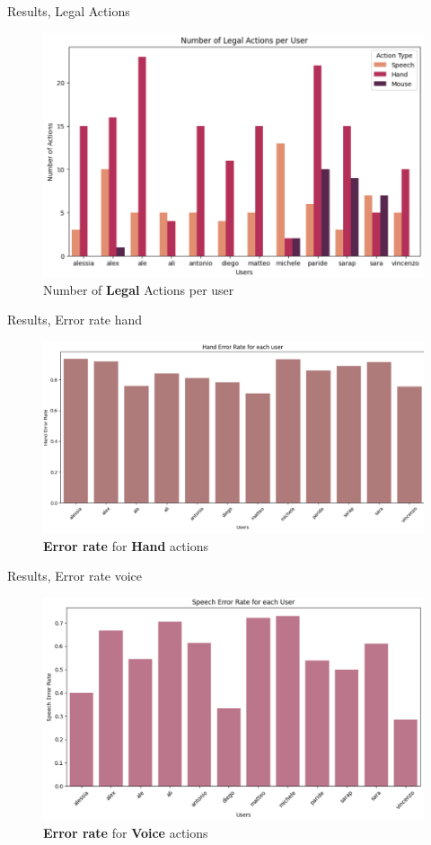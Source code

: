 \documentclass[english]{beamer}
\begin{document}
\begin{frame}{Results, Legal Actions}
    \begin{figure}
        \centering
        \includegraphics[width=.8\textwidth]{images/legal_actions.png}
        \caption{Number of \textbf{Legal} Actions per user}
    \end{figure}
\end{frame}

\begin{frame}{Results, Error rate hand}
    \begin{figure}
        \centering
        \includegraphics[width=.8\textwidth]{images/hand_error_rate.png}
        \caption{\textbf{Error rate} for \textbf{Hand} actions}
    \end{figure}
\end{frame}

\begin{frame}{Results, Error rate voice}
    \begin{figure}
        \centering
        \includegraphics[width=.8\textwidth]{images/speech_error_rate.png}
        \caption{\textbf{Error rate} for \textbf{Voice} actions}
    \end{figure}
\end{frame}
\end{document}
